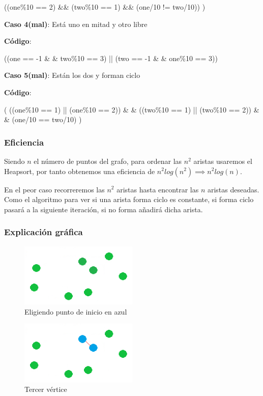 \hspace{1cm}((one\%10 == 2) \&\& (two\%10 == 1) \&\& (one/10 != two/10)) )


\textbf{Caso 4(mal)}: Está uno en mitad y otro libre

\textbf{Código}: 

\hspace{1cm}((one == -1 \& \& two\%10 == 3) || (two == -1 \& \& one\%10 == 3))

\textbf{Caso 5(mal)}: Están los dos y forman ciclo

\textbf{Código}: 

\hspace{1cm}( ((one\%10 == 1) || (one\%10 == 2)) \& \& 
\hspace{1cm}((two\%10 == 1) || (two\%10 == 2)) \& \& (one/10 == two/10) )
            
           
\subsubsection{Eficiencia}
Siendo $n$ el número de puntos del grafo, para ordenar las $n^2$ aristas usaremos el Heapsort, por tanto obtenemos una eficiencia de $n^2log(n^2) \implies n^2log(n)$.

En el peor caso recorreremos las $n^2$ aristas hasta encontrar las $n$ aristas deseadas.
Como el algoritmo para ver si una arista forma ciclo es constante, si forma ciclo pasará a la siguiente iteración, si no forma añadirá dicha arista.


\subsubsection{Explicación gráfica}

\begin{figure}[htbH] 
	\centering
	\includegraphics[width=0.5\textwidth]{./Imagenes/arista1.png}
	\caption{Eligiendo punto de inicio en azul} 
\end{figure}

\vspace{0.5cm}
\begin{figure}[htbH] 
	\centering
	\includegraphics[width=0.5\textwidth]{./Imagenes/arista2.png}
	\caption{Tercer vértice} 
\end{figure}

